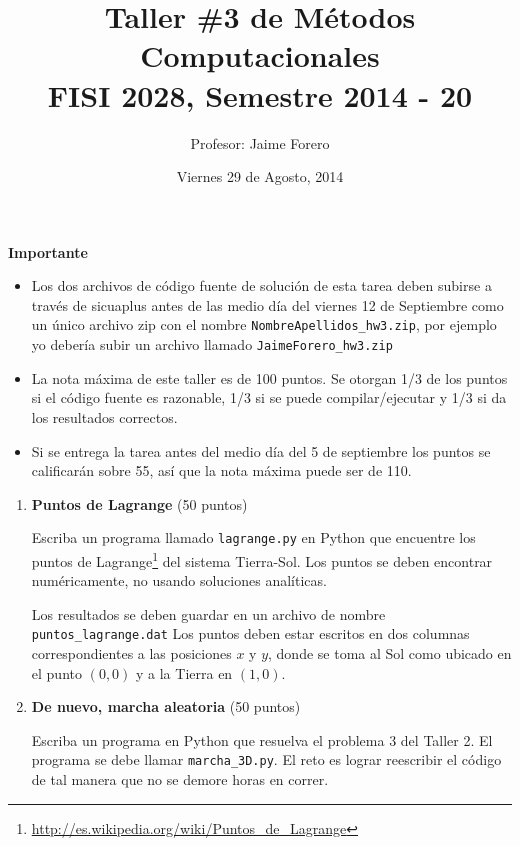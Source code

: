 \documentclass{article}
\title{Taller \#3 de M\'etodos Computacionales\\ FISI 2028, Semestre 2014 - 20}
\author{Profesor: Jaime Forero}
\date{Viernes 29 de Agosto, 2014}
\begin{document}
\maketitle
\thispagestyle{empty}


{\bf Importante}
\begin{itemize}

\item Los dos archivos de c\'odigo fuente de soluci\'on de esta tarea
  deben subirse a trav\'es de sicuaplus antes de las medio d\'ia del
  viernes 12 de Septiembre como un \'unico archivo zip con el nombre
  \verb"NombreApellidos_hw3.zip", por ejemplo yo deber\'ia subir un
  archivo llamado \verb"JaimeForero_hw3.zip" 

\item 
La nota m\'axima de este taller es de 100 puntos. Se otorgan 1/3
  de los puntos si el c\'odigo fuente es razonable, 1/3 si se puede
  compilar/ejecutar y 1/3 si da los resultados correctos.  
\item
Si se entrega la tarea antes del medio d\'ia del 5 de septiembre los
puntos se calificar\'an sobre 55, as\'i que la nota m\'axima puede ser
de 110. 
\end{itemize}

\begin{enumerate}


\item {\bf Puntos de Lagrange}
(50 puntos)

Escriba un programa llamado \verb"lagrange.py" en Python que encuentre
los puntos de
Lagrange\footnote{\url{http://es.wikipedia.org/wiki/Puntos_de_Lagrange}}
del sistema Tierra-Sol. Los puntos se deben
  encontrar num\'ericamente, no usando soluciones anal\'iticas. 
  
  Los resultados se deben guardar en un archivo de nombre
  \verb"puntos_lagrange.dat"  Los puntos deben estar escritos en dos
  columnas correspondientes a las posiciones $x$ y $y$, donde se toma
  al Sol como ubicado en el punto $(0,0)$ y a la Tierra en $(1,0)$. 


\item {\bf De nuevo, marcha aleatoria}
(50 puntos) 

Escriba un programa en Python que resuelva el
  problema 3 del Taller 2. El programa se debe llamar
  \verb"marcha_3D.py". El reto es lograr reescribir el c\'odigo de tal
  manera que no se demore horas en correr. 


\end{enumerate}
\end{document}
